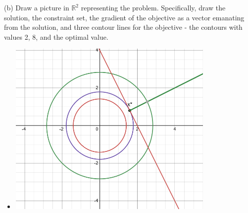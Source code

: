 \documentclass[10pt]{article}
\begin{document}
(b) Draw a picture in $\mathbb{R}^{2}$ representing the problem. Specifically, draw the solution, the constraint set, the gradient of the objective as a vector emanating from the solution, and three contour lines for the objective - the contours with values 2, 8, and the optimal value.
\begin{itemize}
    \item 

 \includegraphics[width=10cm]{homework 11/homework 11 question 3c.png}
\end{itemize}
\end{document}
